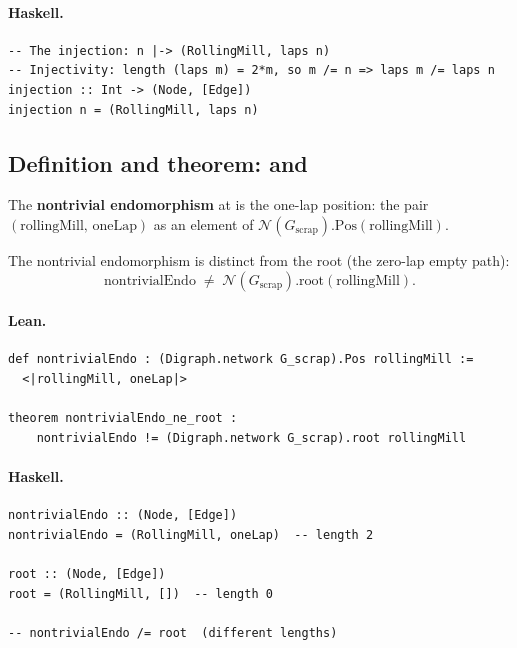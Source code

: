 \documentclass[11pt,a4paper]{article}
\begin{document}
\paragraph{Haskell.}
\begin{lstlisting}[style=haskell]
-- The injection: n |-> (RollingMill, laps n)
-- Injectivity: length (laps m) = 2*m, so m /= n => laps m /= laps n
injection :: Int -> (Node, [Edge])
injection n = (RollingMill, laps n)
\end{lstlisting}


\subsection{Definition and theorem:  and }

\begin{defn}
The \textbf{nontrivial endomorphism} at  is the one-lap
position: the pair $(\mathrm{rollingMill},\, \mathrm{oneLap})$ as an element of
$\mathcal{N}(G_{\mathrm{scrap}}).\mathrm{Pos}(\mathrm{rollingMill})$.
\end{defn}

\begin{thm}
The nontrivial endomorphism is distinct from the root (the zero-lap empty path):
\[
  \mathrm{nontrivialEndo} \;\neq\;
  \mathcal{N}(G_{\mathrm{scrap}}).\mathrm{root}(\mathrm{rollingMill}).
\]
\end{thm}

\paragraph{Lean.}
\begin{lstlisting}[style=lean]
def nontrivialEndo : (Digraph.network G_scrap).Pos rollingMill :=
  <|rollingMill, oneLap|>

theorem nontrivialEndo_ne_root :
    nontrivialEndo != (Digraph.network G_scrap).root rollingMill
\end{lstlisting}

\paragraph{Haskell.}
\begin{lstlisting}[style=haskell]
nontrivialEndo :: (Node, [Edge])
nontrivialEndo = (RollingMill, oneLap)  -- length 2

root :: (Node, [Edge])
root = (RollingMill, [])  -- length 0

-- nontrivialEndo /= root  (different lengths)
\end{lstlisting}
\end{document}
